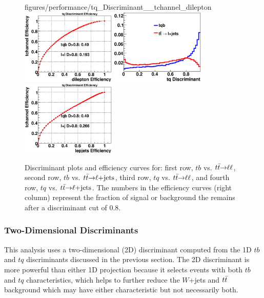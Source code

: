 \begin{figure}[!h!tbp]
{figures/performance/tq_Discriminant__tchannel_dilepton}
\includegraphics[width=0.40\textwidth]
{figures/performance/tq_Efficiency__tchannel_dilepton}
\includegraphics[width=0.40\textwidth]
{figures/performance/tq_Discriminant__tchannel_lepjets}
\includegraphics[width=0.40\textwidth]
{figures/performance/tq_Efficiency__tchannel_lepjets}
\caption[discttbar]{Discriminant plots and efficiency curves for:
first row, $tb$ vs. $\mbox{${\mbox{$t\bar{t}$}}{\rightarrow}\ell\ell$}$, second row, $tb$ vs. $\mbox{${\mbox{$t\bar{t}$}}{\rightarrow}\ell$+jets}$,
third row, $tq$ vs. $\mbox{${\mbox{$t\bar{t}$}}{\rightarrow}\ell\ell$}$, and fourth row, $tq$
vs. $\mbox{${\mbox{$t\bar{t}$}}{\rightarrow}\ell$+jets}$. The numbers in the efficiency curves (right column)
represent the fraction of signal or background the remains after a
discriminant cut of 0.8.}
\label{disc_ttbar}
\end{figure}

\subsubsection{Two-Dimensional Discriminants}

This analysis uses a two-dimensional (2D) discriminant computed from
the 1D $tb$ and $tq$ discriminants discussed in the previous
section. The 2D discriminant is more powerful than either 1D
projection because it selects events with both $tb$ and $tq$
characteristics, which helps to further reduce the $W$+jets and
$\mbox{$t\bar{t}$}$ background which may have either characteristic but not
necessarily both. 

